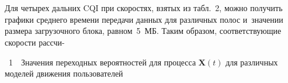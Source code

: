 \begin{multicols}{2}
  \begin{figure*}[b] %
      \vspace*{9pt}
      \begin{minipage}[t]{79mm}
 \begin{center}
 \mbox{%
 \epsfxsize=77.785mm 
 }
\end{center}
\vspace*{-11pt}
\end{minipage}
\hfill
  \vspace*{1pt}
        \begin{minipage}[t]{79mm}
 \begin{center}
 \mbox{%
 \epsfxsize=77.891mm 
 }
\end{center}
\vspace*{-11pt}
\end{minipage}
  \end{figure*}


  
  Для четырех дальних CQI при скоростях, взятых из табл.~2, можно получить 
графики среднего времени передачи данных для различных полос и~значении 
размера загрузочного блока, равном~5~МБ. Таким образом, соответствующие 
скорости рассчи-\linebreak\vspace*{-12pt}

\vspace*{10pt}

 {   %
\noindent
{{\tablename~1}\ \ \small{Значения переходных вероятностей для процесса $\mathbf{X}(t)$ для различных 
моделей движения пользователей}}




}
\end{multicols}
